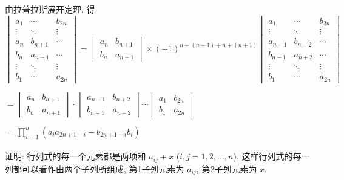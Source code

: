 \begin{enumerate}
			      由拉普拉斯展开定理, 得
			      \[ \begin{vmatrix}
					      a_{1}  & \cdots  & b_{2n} \\
					      \vdots & \ddots  & \vdots \\
					      a_{n}  & b_{n+1} & \cdots \\
					      b_{n}  & a_{n+1} & \cdots \\
					      \vdots & \ddots  & \vdots \\
					      b_{1}  & \cdots  & a_{2n}
				      \end{vmatrix} = \begin{vmatrix}
					      a_{n} & b_{n+1} \\
					      b_{n} & a_{n+1}
				      \end{vmatrix} \times (-1)^{n+(n+1)+n+(n+1)} \begin{vmatrix}
					      a_{1}   & \cdots  & b_{2n} \\
					      \vdots  & \ddots  & \vdots \\
					      a_{n-1} & b_{n+2} & \cdots \\
					      b_{n-1} & a_{n+2} & \cdots \\
					      \vdots  & \ddots  & \vdots \\
					      b_{1}   & \cdots  & a_{2n}
				      \end{vmatrix} \]

			      \( = \begin{vmatrix}
				      a_{n} & b_{n+1} \\
				      b_{n} & a_{n+1}
			      \end{vmatrix} \cdot \begin{vmatrix}
				      a_{n-1} & b_{n+2} \\
				      b_{n-1} & a_{n+2}
			      \end{vmatrix} \cdots \begin{vmatrix}
				      a_{1} & b_{2n} \\
				      b_{1} & a_{2n}
			      \end{vmatrix} \)

			      \( = \prod_{i=1}^{n}\left(a_{i}a_{2n+1-i} - b_{2n+1-i}b_{i}\right) \)
		\end{enumerate}


	\paragraph{} %
		证明: 行列式的每一个元素都是两项和 \( a_{ij} + x \) (\( i,j=1,2,\dots,n \)), 这样行列式的每一列都可以看作由两个子列所组成, 第1子列元素为 \( a_{ij} \), 第2子列元素为 \( x \).

